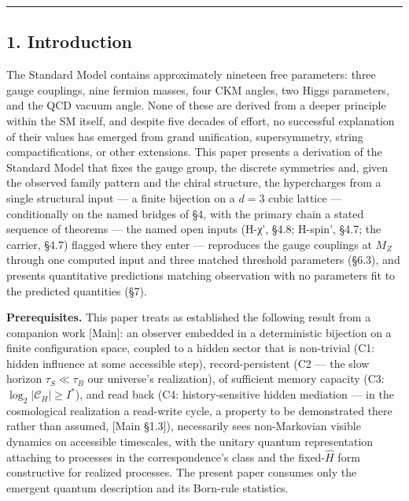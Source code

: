 \documentclass[
]{article}
\begin{document}
\begin{center}\rule{0.5\linewidth}{0.5pt}\end{center}

\hypertarget{introduction}{%
\subsection{1. Introduction}\label{introduction}}

The Standard Model contains approximately nineteen free parameters:
three gauge couplings, nine fermion masses, four CKM angles, two Higgs
parameters, and the QCD vacuum angle. None of these are derived from a
deeper principle within the SM itself, and despite five decades of
effort, no successful explanation of their values has emerged from grand
unification, supersymmetry, string compactifications, or other
extensions. This paper presents a derivation of the Standard Model that
fixes the gauge group, the discrete symmetries and, given the observed
family pattern and the chiral structure, the hypercharges from a single
structural input --- a finite bijection on a \(d = 3\) cubic lattice ---
conditionally on the named bridges of §4, with the primary chain a
stated sequence of theorems --- the named open inputs (H-χ', §4.8;
H-spin', §4.7; the carrier, §4.7) flagged where they enter ---
reproduces the gauge couplings at \(M_Z\) through one computed input and
three matched threshold parameters (§6.3), and presents quantitative
predictions matching observation with no parameters fit to the predicted
quantities (§7).

\textbf{Prerequisites.} This paper treats as established the following
result from a companion work {[}Main{]}: an observer embedded in a
deterministic bijection on a finite configuration space, coupled to a
hidden sector that is non-trivial (C1: hidden influence at some
accessible step), record-persistent (C2 --- the slow horizon
\(\tau_S \ll \tau_B\) our universe's realization), of sufficient memory
capacity (C3: \(\log_2|\mathcal{C}_H| \geq I^*\)), and read back (C4:
history-sensitive hidden mediation --- in the cosmological realization a
read-write cycle, a property to be demonstrated there rather than
assumed, {[}Main §1.3{]}), necessarily sees non-Markovian visible
dynamics on accessible timescales, with the unitary quantum
representation attaching to processes in the correspondence's class and
the fixed-\(\hat{H}\) form constructive for realized processes. The
present paper consumes only the emergent quantum description and its
Born-rule statistics.
\end{document}
